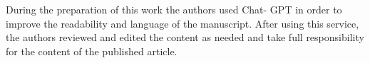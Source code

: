 During the preparation of this work the authors used Chat- GPT in order to improve the readability and language of the manuscript. After using this service, the authors reviewed and edited the content as needed and take full responsibility for the content of the published article.

















